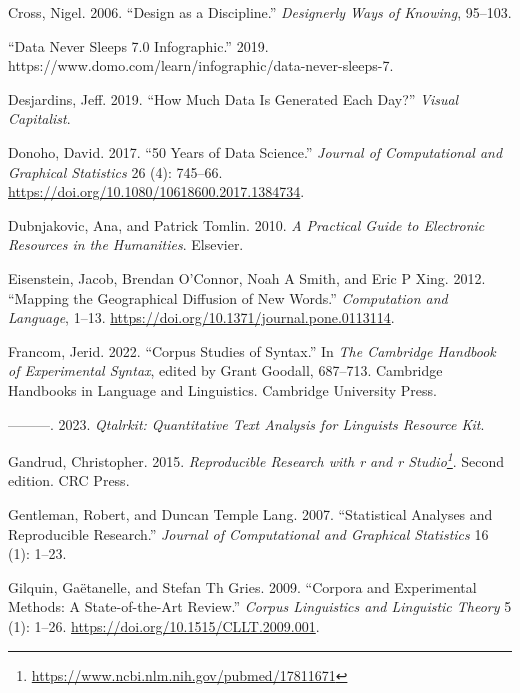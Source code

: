 \documentclass[
  letterpaper,
  DIV=11,
  numbers=noendperiod]{scrreport}
\newlength{\cslhangindent}
\newlength{\cslentryspacingunit} %
\newenvironment{CSLReferences}[2] %
 {%
  \setlength{\parindent}{0pt}
  \ifodd #1
  \let\oldpar\par
  \def\par{\hangindent=\cslhangindent\oldpar}
  \fi
  \setlength{\parskip}{#2\cslentryspacingunit}
 }%
 {}
\theoremstyle{definition}
\theoremstyle{remark}
\DeclareRobustCommand{\href}[2]{#2\footnote{\url{#1}}}
\begin{document}
\begin{CSLReferences}{1}{0}
\leavevmode{}%
Cross, Nigel. 2006. {``Design as a Discipline.''} \emph{Designerly Ways
of Knowing}, 95--103.

\leavevmode{}%
{``Data Never Sleeps 7.0 Infographic.''} 2019.
https://www.domo.com/learn/infographic/data-never-sleeps-7.

\leavevmode{}%
Desjardins, Jeff. 2019. {``How Much Data Is Generated Each Day?''}
\emph{Visual Capitalist}.

\leavevmode{}%
Donoho, David. 2017. {``50 Years of Data Science.''} \emph{Journal of
Computational and Graphical Statistics} 26 (4): 745--66.
\url{https://doi.org/10.1080/10618600.2017.1384734}.

\leavevmode{}%
Dubnjakovic, Ana, and Patrick Tomlin. 2010. \emph{A Practical Guide to
Electronic Resources in the Humanities}. Elsevier.

\leavevmode{}%
Eisenstein, Jacob, Brendan O'Connor, Noah A Smith, and Eric P Xing.
2012. {``Mapping the Geographical Diffusion of New Words.''}
\emph{Computation and Language}, 1--13.
\url{https://doi.org/10.1371/journal.pone.0113114}.

\leavevmode{}%
Francom, Jerid. 2022. {``Corpus Studies of Syntax.''} In \emph{The
Cambridge Handbook of Experimental Syntax}, edited by Grant Goodall,
687--713. Cambridge Handbooks in Language and Linguistics. Cambridge
University Press.

\leavevmode{}%
---------. 2023. \emph{Qtalrkit: Quantitative Text Analysis for
Linguists Resource Kit}.

\leavevmode{}%
Gandrud, Christopher. 2015.
\emph{\href{https://www.ncbi.nlm.nih.gov/pubmed/17811671}{Reproducible
Research with r and r Studio}}. Second edition. CRC Press.

\leavevmode{}%
Gentleman, Robert, and Duncan Temple Lang. 2007. {``Statistical Analyses
and Reproducible Research.''} \emph{Journal of Computational and
Graphical Statistics} 16 (1): 1--23.

\leavevmode{}%
Gilquin, Gaëtanelle, and Stefan Th Gries. 2009. {``Corpora and
Experimental Methods: A State-of-the-Art Review.''} \emph{Corpus
Linguistics and Linguistic Theory} 5 (1): 1--26.
\url{https://doi.org/10.1515/CLLT.2009.001}.


\end{CSLReferences}
\end{document}
